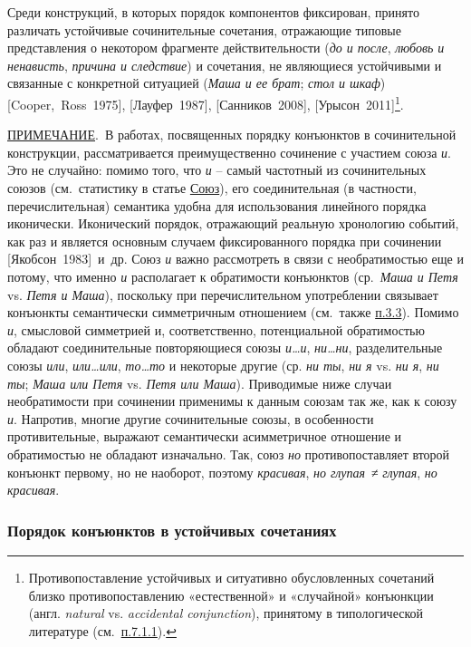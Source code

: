Среди конструкций, в которых порядок компонентов фиксирован, принято
различать устойчивые сочинительные сочетания, отражающие типовые
представления о некотором фрагменте действительности (\textit{до и после},
\textit{любовь и ненависть}, \textit{причина и следствие}) и сочетания, не
являющиеся устойчивыми и связанные с конкретной ситуацией (\textit{Маша и
  ее брат}; \textit{стол и шкаф}) {[}Cooper,~Ross~1975{]},
{[}Лауфер~1987{]}, {[}Санников~2008{]}, {[}Урысон~2011{]}\footnote{Противопоставление
  устойчивых и ситуативно обусловленных сочетаний близко
  противопоставлению «естественной» и «случайной» конъюнкции (англ.
  \textit{natural} vs. \textit{accidental conjunction}), принятому в
  типологической литературе (см.~\underline{п.7.1.1}).}.

\underline{ПРИМЕЧАНИЕ}.~В работах, посвященных порядку конъюнктов в
сочинительной конструкции, рассматривается преимущественно сочинение с
участием союза \textit{и}. Это не случайно: помимо того, что \textit{и} --
самый частотный из сочинительных союзов (см.~статистику в статье
\underline{Союз}), его соединительная (в частности, перечислительная)
семантика удобна для использования линейного порядка иконически.
Иконический порядок, отражающий реальную хронологию событий, как раз и
является основным случаем фиксированного порядка при сочинении
{[}Якобсон~1983{]}~и~др. Союз \textit{и} важно рассмотреть в связи с
необратимостью еще и потому, что именно \textit{и} располагает к
обратимости конъюнктов (ср.~\textit{Маша и Петя} vs. \textit{Петя и Маша}),
поскольку при перечислительном употреблении связывает конъюнкты
семантически симметричным отношением (см.~также \underline{п.3.3}).
Помимо \textit{и}, смысловой симметрией и, соответственно, потенциальной
обратимостью обладают соединительные повторяющиеся союзы
\textit{и\ldots и}, \textit{ни\ldots ни}, разделительные союзы \textit{или},
\textit{или\ldots или}, \textit{то\ldots то} и некоторые другие (ср.
\textit{ни ты}, \textit{ни я} vs. \textit{ни я}, \textit{ни ты}; \textit{Маша или
  Петя} vs. \textit{Петя или Маша}). Приводимые ниже случаи необратимости
при сочинении применимы к данным союзам так же, как к союзу \textit{и}.
Напротив, многие другие сочинительные союзы, в особенности
противительные, выражают семантически асимметричное отношение и
обратимостью не обладают изначально. Так, союз \textit{но}
противопоставляет второй конъюнкт первому, но не наоборот, поэтому
\textit{красивая}, \textit{но глупая}~≠ \textit{глупая}, \textit{но красивая}.

\subsubsection{Порядок конъюнктов в устойчивых
  сочетаниях}\label{ux43fux43eux440ux44fux434ux43eux43a-ux43aux43eux43dux44aux44eux43dux43aux442ux43eux432-ux432-ux443ux441ux442ux43eux439ux447ux438ux432ux44bux445-ux441ux43eux447ux435ux442ux430ux43dux438ux44fux445}

